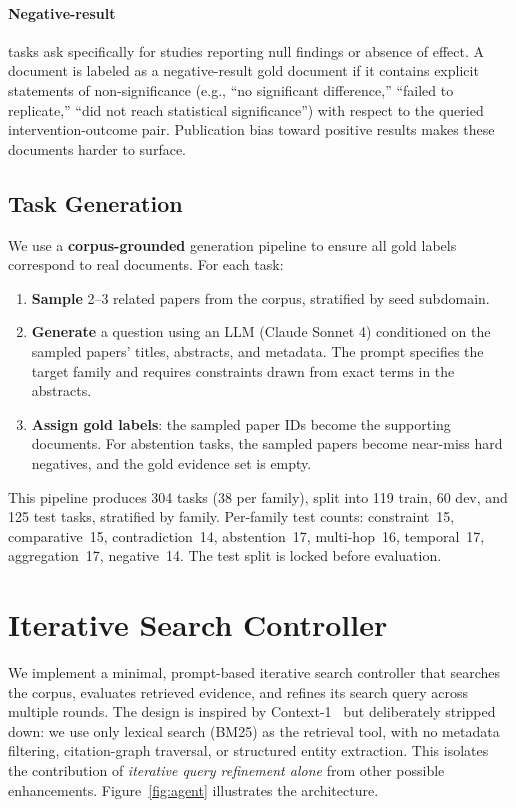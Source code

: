 \documentclass{article}
\begin{document}
\paragraph{Negative-result} tasks ask specifically for studies reporting null findings or absence of effect. A document is labeled as a negative-result gold document if it contains explicit statements of non-significance (e.g., ``no significant difference,'' ``failed to replicate,'' ``did not reach statistical significance'') with respect to the queried intervention-outcome pair. Publication bias toward positive results makes these documents harder to surface.

\subsection{Task Generation}

We use a \textbf{corpus-grounded} generation pipeline to ensure all gold labels correspond to real documents. For each task:
\begin{enumerate}[leftmargin=*,itemsep=1pt,topsep=2pt]
\item \textbf{Sample} 2--3 related papers from the corpus, stratified by seed subdomain.
\item \textbf{Generate} a question using an LLM (Claude Sonnet 4) conditioned on the sampled papers' titles, abstracts, and metadata. The prompt specifies the target family and requires constraints drawn from exact terms in the abstracts.
\item \textbf{Assign gold labels}: the sampled paper IDs become the supporting documents. For abstention tasks, the sampled papers become near-miss hard negatives, and the gold evidence set is empty.
\end{enumerate}

This pipeline produces 304 tasks (38 per family), split into 119 train, 60 dev, and 125 test tasks, stratified by family. Per-family test counts: constraint~15, comparative~15, contradiction~14, abstention~17, multi-hop~16, temporal~17, aggregation~17, negative~14. The test split is locked before evaluation.

\section{Iterative Search Controller}
\label{sec:method}

We implement a minimal, prompt-based iterative search controller that searches the corpus, evaluates retrieved evidence, and refines its search query across multiple rounds. The design is inspired by Context-1~\cite{context2026} but deliberately stripped down: we use only lexical search (BM25) as the retrieval tool, with no metadata filtering, citation-graph traversal, or structured entity extraction. This isolates the contribution of \emph{iterative query refinement alone} from other possible enhancements. Figure~\ref{fig:agent} illustrates the architecture.
\end{document}
